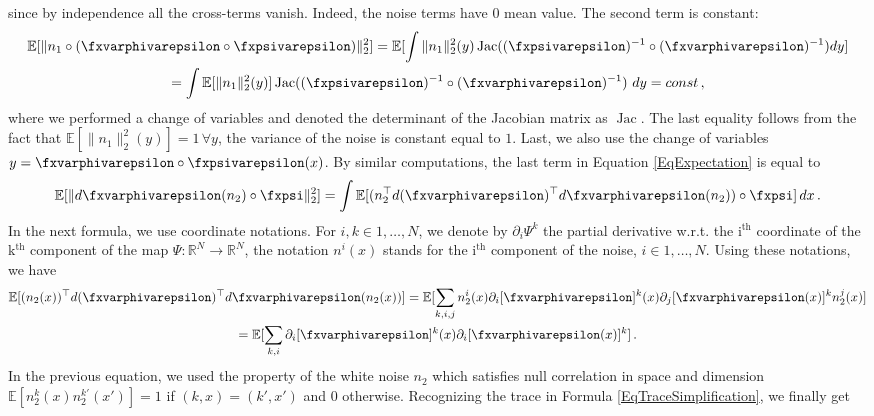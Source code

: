since by independence all the cross-terms vanish. Indeed, the noise terms have $0$ mean value.
The second term is constant:
\begin{multline}
    \mathbb{E}[\|n_1\circ(\fxvarphivarepsilon \circ \fxpsivarepsilon)\|^2_2] =
     \mathbb{E}[\int \| n_1\|^2_2(y)\operatorname{Jac}((\fxpsivarepsilon)^{-1} \circ (\fxvarphivarepsilon)^{-1}) dy]  \\
     = \int \mathbb{E}[\|n_1\|^2_2(y)] \operatorname{Jac}((\fxpsivarepsilon)^{-1} \circ (\fxvarphivarepsilon)^{-1})~dy= const \,, \nonumber
\end{multline}
where we performed a change of variables and denoted the determinant of the Jacobian matrix as $\operatorname{Jac}$. The last equality follows from the fact that $\mathbb{E}[\|n_1\|^2_2(y)] = 1 \,\forall y$, \ie the variance of the noise is constant equal to $1$. Last, we also use the change of variables $y = \fxvarphivarepsilon \circ \fxpsivarepsilon(x)$.
By similar computations, the last term in Equation \eqref{EqExpectation} is equal to
\begin{equation}\label{EqWhiteNoise}
  \mathbb{E}[\|d\fxvarphivarepsilon( n_2) \circ \fxpsi \|^2_2] =   \int \mathbb{E}[(n_2^{\top}d(\fxvarphivarepsilon)^{\top} d\fxvarphivarepsilon(n_2)) \circ \fxpsi]\,dx\,.
  \end{equation}
  In the next formula, we use coordinate notations. For $i,k \in 1,\ldots , N$, we denote by $\partial_i \Psi^k$ the partial derivative w.r.t. the i$^{\text{th}}$ coordinate of the k$^{\text{th}}$ component of the map $\Psi: \mathbb{R}^N \to \mathbb{R}^N$, the notation $n^i(x)$ stands for the i$^{\text{th}}$ component of the noise, $i \in 1,\ldots , N$. 
Using these notations, we have 
  \begin{multline}\label{EqTraceSimplification}
     \mathbb{E}[(n_2(x))^{\top}d(\fxvarphivarepsilon)^{\top} d\fxvarphivarepsilon(n_2(x))]=\mathbb{E}[ \sum_{k,i,j} n_2^i(x)\partial_i [\fxvarphivarepsilon]^k(x) \partial_j [\fxvarphivarepsilon(x)]^k n_2^j(x)]
     \\
     =\mathbb{E}[ \sum_{k,i} \partial_i [\fxvarphivarepsilon]^k(x) \partial_i [\fxvarphivarepsilon(x)]^k]
     \,.
  \end{multline}
   In the previous equation, we used the property of the white noise $n_2$ which satisfies null correlation in space and dimension $\mathbb{E}[n_2^k(x)n_2^{k'}(x')] = 1$ if $(k,x)=(k',x')$ and $0$ otherwise. Recognizing the trace in Formula \eqref{EqTraceSimplification}, we finally get
